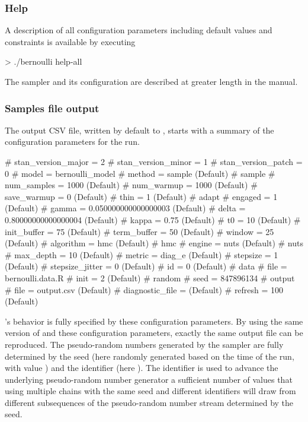 \documentclass[article]{jss}
\begin{document}
\subsubsection{Help}

A description of all configuration parameters including default values
and constraints is available by executing
%
\begin{CodeChunk}
\begin{CodeInput}
> ./bernoulli help-all
\end{CodeInput}
\end{CodeChunk}
%
The sampler and its configuration are described at greater length in
the manual.

\subsubsection{Samples file output}

The output CSV file, written by default to , starts
with a summary of the configuration parameters for the run.
%
\begin{Code}
# stan_version_major = 2
# stan_version_minor = 1
# stan_version_patch = 0
# model = bernoulli_model
# method = sample (Default)
#   sample
#     num_samples = 1000 (Default)
#     num_warmup = 1000 (Default)
#     save_warmup = 0 (Default)
#     thin = 1 (Default)
#     adapt
#       engaged = 1 (Default)
#       gamma = 0.050000000000000003 (Default)
#       delta = 0.80000000000000004 (Default)
#       kappa = 0.75 (Default)
#       t0 = 10 (Default)
#       init_buffer = 75 (Default)
#       term_buffer = 50 (Default)
#       window = 25 (Default)
#     algorithm = hmc (Default)
#       hmc
#         engine = nuts (Default)
#           nuts
#             max_depth = 10 (Default)
#         metric = diag_e (Default)
#         stepsize = 1 (Default)
#         stepsize_jitter = 0 (Default)
# id = 0 (Default)
# data
#   file = bernoulli.data.R
# init = 2 (Default)
# random
#   seed = 847896134
# output
#   file = output.csv (Default)
#   diagnostic_file =  (Default)
#   refresh = 100 (Default)
\end{Code}
%
's behavior is fully specified by these configuration
parameters.  By using the same version of  and these
configuration parameters, exactly the same output file can be
reproduced.  The pseudo-random numbers generated by the sampler are
fully determined by the seed (here randomly generated based on the
time of the run, with value ) and the identifier (here
).  The identifier is used to advance the underlying
pseudo-random number generator a sufficient number of values that
using multiple chains with the same seed and different identifiers
will draw from different subsequences of the pseudo-random number
stream determined by the seed.
\end{document}
